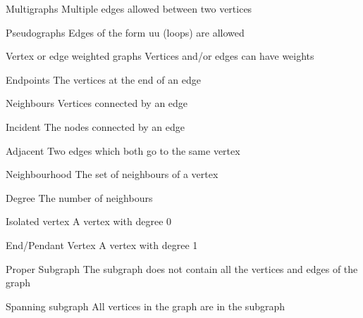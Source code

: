 \documentclass[grid,avery5371]{flashcards}
\begin{document}
\begin{flashcard}[]{Multigraphs}
	Multiple edges allowed between two vertices
\end{flashcard}

\begin{flashcard}[]{Pseudographs}
	Edges of the form uu (loops) are allowed
\end{flashcard}

\begin{flashcard}[]{Vertex or edge weighted graphs}
	Vertices and/or edges can have weights
\end{flashcard}

\begin{flashcard}[]{Endpoints}
	The vertices at the end of an edge
\end{flashcard}

\begin{flashcard}[]{Neighbours}
	Vertices connected by an edge
\end{flashcard}

\begin{flashcard}[]{Incident}
	The nodes connected by an edge
\end{flashcard}

\begin{flashcard}[]{Adjacent}
	Two edges which both go to the same vertex
\end{flashcard}

\begin{flashcard}[]{Neighbourhood}
	The set of neighbours of a vertex
\end{flashcard}

\begin{flashcard}[]{Degree}
	The number of neighbours
\end{flashcard}

\begin{flashcard}[]{Isolated vertex}
	A vertex with degree 0
\end{flashcard}

\begin{flashcard}[]{End/Pendant Vertex}
	A vertex with degree 1
\end{flashcard}

\begin{flashcard}[]{Proper Subgraph}
	The subgraph does not contain all the vertices and edges of the graph
\end{flashcard}

\begin{flashcard}[]{Spanning subgraph}
	All vertices in the graph are in the subgraph
\end{flashcard}
\end{document}
